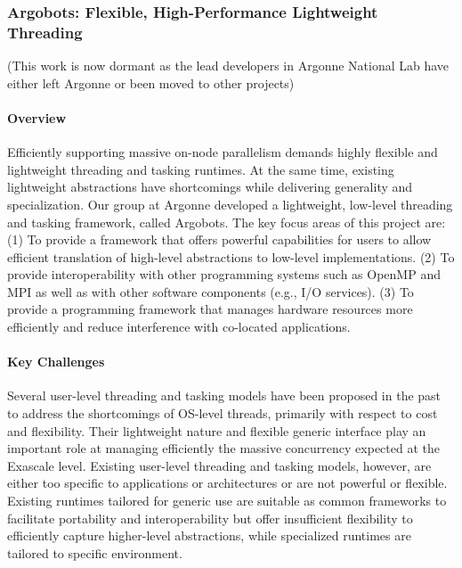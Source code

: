 \subsubsection{ Argobots: Flexible, High-Performance Lightweight Threading }

(This work is now dormant as the lead developers in Argonne National Lab have either left Argonne or been moved to other projects)

\paragraph{Overview}
Efficiently supporting massive on-node parallelism demands highly
flexible and lightweight threading and tasking runtimes. At the
same time, existing lightweight abstractions have shortcomings while
delivering generality and specialization.  Our group at Argonne
developed a lightweight, low-level threading and tasking framework,
called Argobots.  The key focus areas of this project are: (1) To
provide a framework that offers powerful capabilities for users to
allow efficient translation of high-level abstractions to low-level
implementations. (2) To provide interoperability with other
programming systems such as OpenMP and MPI as well as with other
software components (e.g., I/O services). (3) To provide a programming
framework that manages hardware resources more efficiently and reduce
interference with co-located applications.

\paragraph{Key Challenges}
Several user-level threading and tasking models have been proposed in
the past to address the shortcomings of OS-level threads, primarily
with respect to cost and flexibility. Their lightweight nature and
flexible generic interface play an important role at managing
efficiently the massive concurrency expected at the Exascale level.
Existing user-level threading and tasking models, however, are either
too specific to applications or architectures or are not powerful or
flexible. Existing runtimes tailored for generic use \cite{GNUPth,
PLDI97_Taura, COSET05_Thibault, COB14_Nakashima, MTAAP08_Wheeler,
PPoPP99_Taura, SenSys06_Dunkels, TBB1, EuroPar08_Perache} are suitable
as common frameworks to facilitate portability and interoperability
but offer insufficient flexibility to efficiently capture higher-level
abstractions, while specialized runtimes \cite{ATC02_Adya,
SolarisThreads, SOSP03_von_Behren, StateThreads, PLDI07_Li,
MTAAP09_Porterfield, WMPP05_Cuvillo, IntelOMP, Nanos++, LCPC96_Kale,
PACT14_Treichler} are tailored to specific environment.

